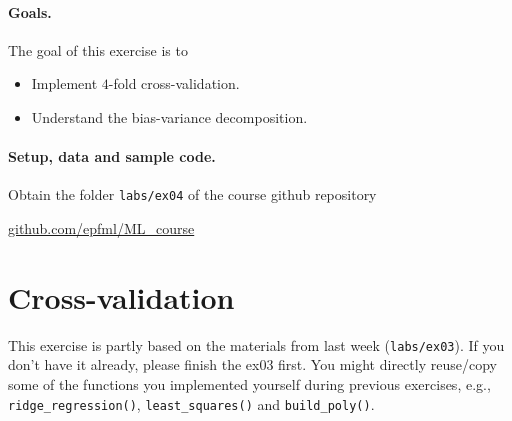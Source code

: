 \documentclass{../tex_import/ETHuebung_english}
\begin{document}

\paragraph{Goals.}
The goal of this exercise is to
\begin{itemize}
    \item Implement $4$-fold cross-validation.
    \item Understand the bias-variance decomposition.
\end{itemize}

\paragraph{Setup, data and sample code.}
Obtain the folder {\tt labs/ex04} of the course github repository
\begin{center}
\href{https://github.com/epfml/ML\_course/tree/main/labs/ex04}{github.com/epfml/ML\_course}
\end{center}

\section{Cross-validation}

This exercise is partly based on the materials from last week ({\tt labs/ex03}).
If you don't have it already, please finish the ex03 first.
You might directly reuse/copy
some of the functions you implemented yourself during previous exercises,
e.g., {\tt ridge\_regression()}, {\tt least\_squares()} and {\tt build\_poly()}.



\end{document}
